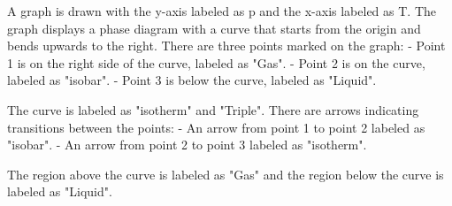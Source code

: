 A graph is drawn with the y-axis labeled as p and the x-axis labeled as T. The graph displays a phase diagram with a curve that starts from the origin and bends upwards to the right. There are three points marked on the graph:
- Point 1 is on the right side of the curve, labeled as "Gas".
- Point 2 is on the curve, labeled as "isobar".
- Point 3 is below the curve, labeled as "Liquid".

The curve is labeled as "isotherm" and "Triple". There are arrows indicating transitions between the points:
- An arrow from point 1 to point 2 labeled as "isobar".
- An arrow from point 2 to point 3 labeled as "isotherm".

The region above the curve is labeled as "Gas" and the region below the curve is labeled as "Liquid".